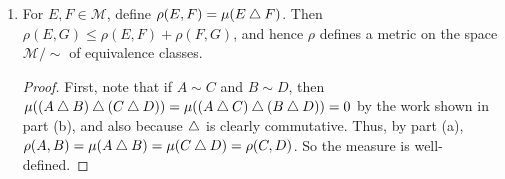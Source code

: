 \documentclass[10pt]{article}
\newcommand{\M}{\mathcal{M}}
\begin{document}
\begin{enumerate}
\begin{enumerate}
\begin{proof}
For transitivity, two facts will be useful.  First, $\sd$ is associative, which can be seen in the below truth table:
\begin{center}
\begin{tabular}{|c|c|c|c|c|c|c|}
\hline 
$A$ & $B$ & $C$ & $A\sd B$ & $B \sd C$ & $(A \sd B) \sd C$ & $A \sd (B \sd C)$ \\ 
\hline 
$T$ & $T$ & $T$ & $F$ & $F$ & $T$ & $T$ \\ 
\hline 
$T$ & $T$ & $F$ & $F$ & $T$ & $F$ & $F$ \\ 
\hline 
$T$ & $F$ & $T$ & $T$ & $T$ & $F$ & $F$ \\ 
\hline 
$T$ & $F$ & $F$ & $T$ & $F$ & $T$ & $T$ \\ 
\hline 
$F$ & $T$ & $T$ & $T$ & $F$ & $F$ & $F$ \\ 
\hline 
$F$ & $T$ & $F$ & $T$ & $T$ & $T$ & $T$ \\ 
\hline 
$F$ & $F$ & $T$ & $F$ & $T$ & $T$ & $T$ \\ 
\hline 
$F$ & $F$ & $F$ & $F$ & $F$ & $F$ & $F$ \\ 
\hline 
\end{tabular} 
\end{center}
Also, recall that $E \sd E = \emptyset$.  Therefore, $A \sd C = A \sd (B \sd B) \sd C = (A \sd B) \sd (B \sd C)$.  Next, if $\mu(A) = \mu(B) = 0$, then $\mu(A \sd B) = \mu((A \cup B) \setminus (A \cap B)) \leq \mu(A \cup B) \leq \mu(A) + \mu(B) = 0$, so $\mu(A \sd B) = 0$.

Now, suppose $E \sim F$ and $F \sim G$.  Then $\mu(E \sd F) = \mu(F \sd G) = 0$.  Thus, we have $\mu(E \sd G) = \mu((E \sd F) \sd (F \sd G)) = 0$ by the results of the previous paragraph, so $E \sim G$.  Thus, $\sim$ is an equivalence relation.
\end{proof}

\item For $E,F \in \M$, define $\rho (E,F) = \mu(E \bigtriangleup F)$.  Then $\rho (E,G) \leq \rho(E,F) + \rho(F,G)$, and hence $\rho$ defines a metric on the space $\M / \sim$ of equivalence classes.

\begin{proof}
First, note that if $A \sim C$ and $B \sim D$, then $\mu((A \bigtriangleup B) \bigtriangleup (C \bigtriangleup D)) = \mu((A \bigtriangleup C) \bigtriangleup (B \bigtriangleup D)) = 0$ by the work shown in part (b), and also because $\sd$ is clearly commutative.  Thus, by part (a), $\rho(A,B) = \mu(A \bigtriangleup B) = \mu(C \bigtriangleup D) = \rho(C,D)$.  So the measure is well-defined.


\end{proof}
\end{enumerate}
\end{enumerate}
\end{document}
